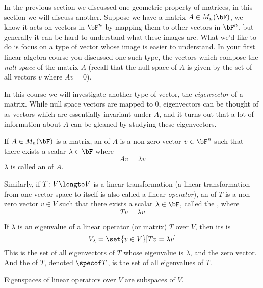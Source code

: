 
In the previous section we discussed one geometric property of matrices, in this section we will discuss another.
Suppose we have a matrix $A\in M_n(\bF)$, we know it acts on vectors in $\bF^n$ by mapping them to other vectors in $\bF^n$, but generally it can be hard to understand what these images are.
What we'd like to do is focus on a type of vector whose image is easier to understand.
In your first linear algebra course you discussed one such type, the vectors which compose the \emph{null space} of the matrix $A$ (recall that the null space of $A$ is given by the set of all vectors $v$
where $Av=0$).

In this course we will investigate another type of vector, the \emph{eigenvector} of a matrix.
While null space vectors are mapped to $0$, eigenvectors can be thought of as vectors which are essentially invariant under $A$, and it turns out that a lot of information about $A$ can be gleaned by
studying these eigenvectors.

\begin{defn*}

    If $A\in M_n(\bF)$ is a matrix, an  of $A$ is a non-zero vector $v\in\bF^n$ such that there exists a scalar $\lambda\in\bF$ where
    \[ Av = \lambda v \]
    $\lambda$ is called an  of $A$.

    Similarly, if $T\colon V\longto V$ is a linear transformation (a linear transformation from one vector space to itself is also called a linear \emph{operator}), an  of $T$ is a
    non-zero vector $v\in V$ such that there exists a scalar $\lambda\in\bF$, called the , where
    \[ Tv = \lambda v \]

    If $\lambda$ is an eigenvalue of a linear operator (or matrix) $T$ over $V$, then its  is
    \[ V_\lambda = \set{v\in V}[Tv = \lambda v] \]
    This is the set of all eigenvectors of $T$ whose eigenvalue is $\lambda$, and the zero vector.
    And the  of $T$, denoted $\specof T$, is the set of all eigenvalues of $T$.

\end{defn*}

\begin{prop*}

    Eigenspaces of linear operators over $V$ are subspaces of $V$.

\end{prop*}

